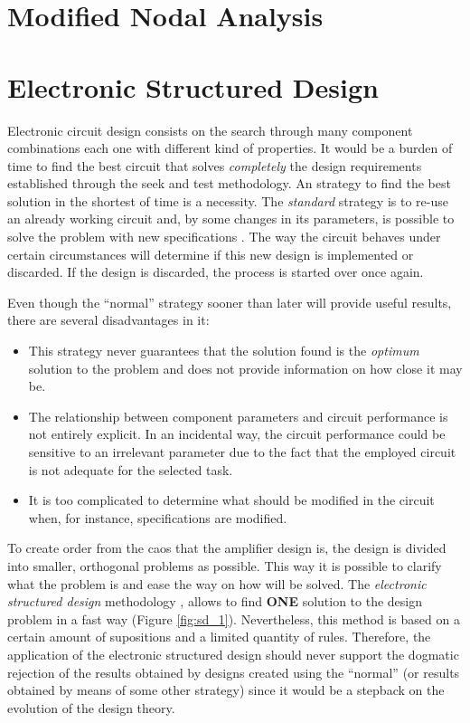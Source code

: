 \documentclass[twocolumn]{IEEEtran}
\begin{document}
\section{Modified Nodal Analysis}


\section{Electronic Structured Design}
Electronic circuit design consists on the search through many component combinations each one with different kind of properties. It would be a burden of time to find the best circuit that solves {\it completely} the design requirements established through the seek and test methodology. An strategy to find the best solution in the shortest of time is a necessity. The {\it standard} strategy is to re-use an already working circuit and, by some changes in its parameters, is possible to solve the problem with new specifications \cite{verhoeven}. The way the circuit behaves under certain circumstances will determine if this new design is implemented or discarded. If the design is discarded, the process is started over once again.

Even though the ``normal'' strategy sooner than later will provide useful results, there are several disadvantages in it:

\begin{itemize}
\item This strategy never guarantees that the solution found is the {\it optimum} solution to the problem and does not provide information on how close it may be.
\item The relationship between component parameters and circuit performance is not entirely explicit. In an incidental way, the circuit performance could be sensitive to an irrelevant parameter due to the fact that the employed circuit is not adequate for the selected task.
\item It is too complicated to determine what should be modified in the circuit when, for instance, specifications are modified.
\end{itemize}

To create order from the caos that the amplifier design is, the design is divided into smaller, orthogonal problems as possible. This way it is possible to clarify what the problem is and ease the way on how will be solved. The {\it electronic structured design} methodology \cite{verhoeven}, \cite{nordholt} allows to find {\bf ONE} solution to the design problem in a fast way (Figure \ref{fig:sd_1}). Nevertheless, this method is based on a certain amount of supositions and a limited quantity of rules. Therefore, the application of the electronic structured design should never support the dogmatic rejection of the results obtained by designs created using the ``normal'' (or results obtained by means of some other strategy) since it would be a stepback on the evolution of the design theory.
\end{document}
